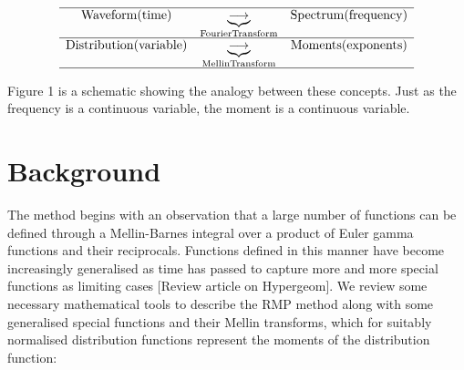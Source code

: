 \documentclass[journal=jcisd8,manuscript=article,layout=onecolumn,pdftex,floatfix,amsmath,amssymb,10pt]{achemso}
\begin{document}
\begin{equation}
\begin{matrix}
\hline
\mathrm{Waveform}(\mathrm{time}) & \underbrace{\longrightarrow}_{\mathrm{Fourier Transform}} & \mathrm{Spectrum}(\mathrm{frequency})\\
\hline
\mathrm{Distribution}(\mathrm{variable}) & \underbrace{\longrightarrow}_{\mathrm{Mellin Transform}} & \mathrm{Moments}(\mathrm{exponents}) \\
\hline
\end{matrix}
\end{equation}

Figure 1 is a schematic showing the analogy between these concepts. Just as the frequency is a continuous variable, the moment is a continuous variable. 


\section{Background}
The method begins with an observation that a large number of functions can be defined through a Mellin-Barnes integral over a product of Euler gamma functions and their reciprocals. Functions defined in this manner have become increasingly generalised as time has passed to capture more and more special functions as limiting cases [Review article on Hypergeom]. We review some necessary mathematical tools to describe the RMP method along with some generalised special functions and their Mellin transforms, which for suitably normalised distribution functions represent the moments of the distribution function:
\end{document}
